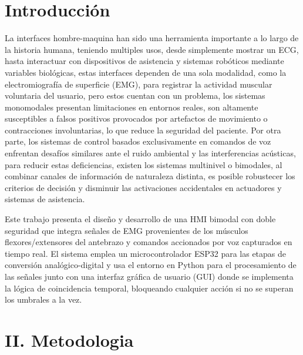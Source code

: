 \documentclass[conference]{IEEEtran}
\begin{document}
\section{Introducci\'on}
La interfaces hombre-maquina han sido una herramienta importante a lo largo de la historia humana, teniendo multiples usos, desde simplemente mostrar un ECG, hasta interactuar con dispositivos de asistencia y sistemas rob\'oticos mediante variables biol\'ogicas, estas interfaces dependen de una sola modalidad, como la electromiograf\'ia de superficie (EMG), para registrar la actividad muscular voluntaria del usuario, pero estos cuentan con un problema, los sistemas monomodales presentan limitaciones en entornos reales, son altamente susceptibles a falsos positivos provocados por artefactos de movimiento o contracciones involuntarias, lo que reduce la seguridad del paciente. Por otra parte, los sistemas de control basados exclusivamente en comandos de voz enfrentan desaf\'ios similares ante el ruido ambiental y las interferencias ac\'usticas, para reducir estas deficiencias, existen los sistemas multinivel o bimodales, al combinar canales de informaci\'on de naturaleza distinta, es posible robustecer los criterios de decisi\'on y disminuir las activaciones accidentales en actuadores y sistemas de asistencia.

Este trabajo presenta el dise\~no y desarrollo de una HMI bimodal con doble seguridad que integra se\~nales de EMG provenientes de los m\'usculos flexores/extensores del antebrazo y comandos accionados por voz capturados en tiempo real. El sistema emplea un microcontrolador ESP32 para las etapas de conversi\'on anal\'ogico-digital y usa el entorno en Python para el procesamiento de las se\~nales junto con una interfaz gr\'afica de usuario (GUI) donde se implementa la l\'ogica de coincidencia temporal, bloqueando cualquier acci\'on si no se superan los umbrales a la vez. 

\section{II. Metodologia}
\end{document}
